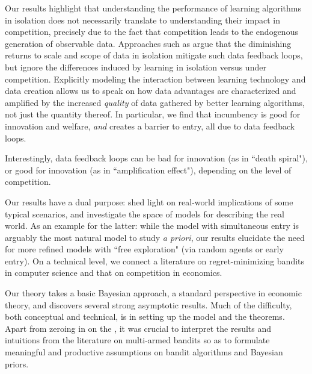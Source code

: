 Our results highlight that understanding the performance of learning algorithms in isolation does not necessarily translate to understanding their impact in competition, precisely due to the fact that competition leads to the endogenous generation of observable data. Approaches such as \citet{lambrecht2015can, bajari2018impact, varian2018artificial} argue that the diminishing returns to scale and scope of data in isolation mitigate such data feedback loops,
but ignore the differences induced by learning in isolation versus under competition. Explicitly modeling the interaction between learning technology and data creation allows us to speak on how data advantages are characterized and amplified by the increased \emph{quality} of data gathered by better learning algorithms, not just the quantity thereof. In particular, we find that incumbency is good for innovation and welfare, \emph{and} %
creates a barrier to entry,
all %
due to data feedback loops.

Interestingly,
data feedback loops can be bad for innovation (as in ``death spiral"), or good for innovation (as in ``amplification effect"), depending on the level of competition.



Our results have a dual purpose: shed light on real-world implications of some typical scenarios, and investigate the space of models for describing the real world. As an example for the latter: while the \HardMax model with simultaneous entry is arguably the most natural model to study \emph{a priori}, our results elucidate the need for more refined models with ``free exploration" (\eg via random agents or early entry). On a technical level, we connect a literature on regret-minimizing bandits in computer science and that on competition in economics.

Our theory takes a basic Bayesian approach, a standard perspective in economic theory, and discovers several strong asymptotic results. Much of the difficulty, both conceptual and technical, is in setting up the model and the theorems. Apart from zeroing in on the \TheoryModel, it was crucial to interpret the results and intuitions from the literature on multi-armed bandits so as to formulate meaningful and productive assumptions on bandit algorithms and Bayesian priors.

